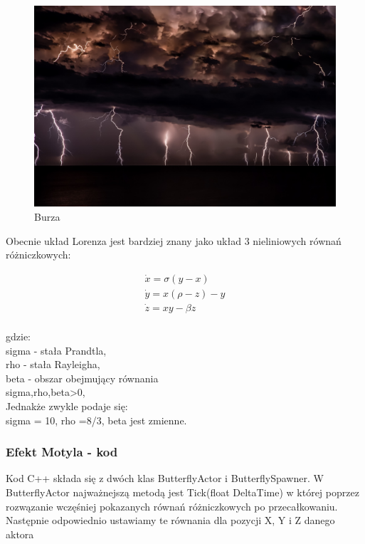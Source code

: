 \documentclass[a4paper,12pt,reqno]{article}
\begin{document}
\begin{figure}[H]%
\centering
\includegraphics[width=0.7\columnwidth]{graphics/butterfly/josep_castells_burza.jpg}
\caption{Burza 
\label{BPExample}}%
%
\qquad
\end{figure} 

Obecnie układ Lorenza jest bardziej znany jako układ 3 nieliniowych
równań różniczkowych\cite{lorenz_dziwne_atraktory}:

\begin{equation}
\begin{split}
\dot{x}=\sigma(y-x)\\
\dot{y}=x(\rho-z)-y\\
\dot{z}=xy-\beta z\\
\end{split}
\end{equation}

gdzie:\\
sigma - stała Prandtla,\\
rho - stała Rayleigha,\\
beta - obszar obejmujący równania\\
sigma,rho,beta>0,\\
Jednakże zwykle podaje się:\\
sigma = 10, rho =8/3, beta jest zmienne.\\

\subsubsection{Efekt Motyla - kod}

Kod C++ składa się z dwóch klas ButterflyActor i ButterflySpawner.
W ButterflyActor najważnejszą metodą jest Tick(float DeltaTime) w której poprzez rozwązanie wczęśniej pokazanych równań różniczkowych po przecałkowaniu. Następnie odpowiednio ustawiamy te równania dla pozycji X, Y i Z danego aktora\cite{motyle_cpp}
\end{document}
